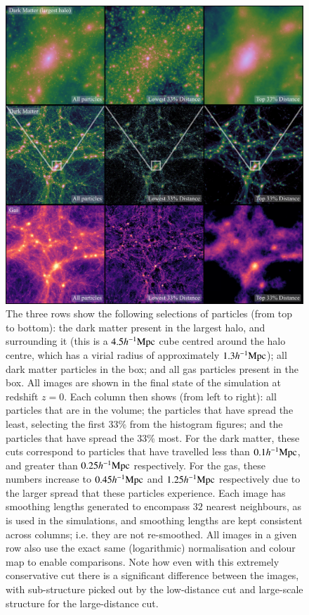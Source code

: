\begin{figure}
    \centering
    \includegraphics[width=\textwidth]{figures/distance_figures_3.pdf}
    \caption{The three rows show the following selections of particles (from
    top to bottom): the dark matter present in the largest halo, and
    surrounding it (this is a $4.5h^{-1}{\rm Mpc}{}$ cube centred around the halo
    centre, which has a virial radius of approximately $1.3h^{-1}{\rm Mpc}{}$); all
    dark matter particles in the box; and all gas particles present in the
    box. All images are shown in the final state of the simulation at
    redshift $z=0$. Each column then shows (from left to right): all
    particles that are in the volume; the particles that have spread the
    least, selecting the first 33\% from the histogram figures; and the
    particles that have spread the 33\% most. For the dark matter, these cuts
    correspond to particles that have travelled less than $0.1h^{-1}{\rm Mpc}{}$, and
    greater than $0.25h^{-1}{\rm Mpc}{}$ respectively. For the gas, these numbers
    increase to $0.45h^{-1}{\rm Mpc}{}$ and $1.25h^{-1}{\rm Mpc}{}$ respectively due to the
    larger spread that these particles experience. Each image has smoothing
    lengths generated to encompass $32$ nearest neighbours, as is used in the
    \simba{} simulations, and smoothing lengths are kept consistent across
    columns; i.e. they are not re-smoothed. All images in a given row also
    use the exact same (logarithmic) normalisation and colour map to enable
    comparisons. Note how even with this extremely conservative cut there is
    a significant difference between the images, with sub-structure picked
    out by the low-distance cut and large-scale structure for the
    large-distance cut.}
    \vspace{1cm}
    \label{fig:bigdistanceimage}
\end{figure}

